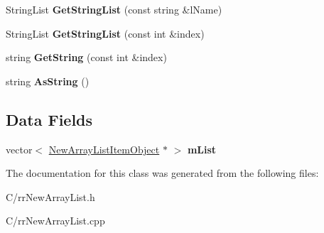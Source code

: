 \begin{DoxyCompactItemize}
\item 
\hypertarget{classrrc_1_1_new_array_list_a88f413f85d878aa501cfa0d9393af83d}{String\-List {\bfseries Get\-String\-List} (const string \&l\-Name)}\label{classrrc_1_1_new_array_list_a88f413f85d878aa501cfa0d9393af83d}

\item 
\hypertarget{classrrc_1_1_new_array_list_a0d713d8ec0ca7a64280381f7cf4f5519}{String\-List {\bfseries Get\-String\-List} (const int \&index)}\label{classrrc_1_1_new_array_list_a0d713d8ec0ca7a64280381f7cf4f5519}

\item 
\hypertarget{classrrc_1_1_new_array_list_a5d5c7bbe7e47d8a8f91911a7bcd4636d}{string {\bfseries Get\-String} (const int \&index)}\label{classrrc_1_1_new_array_list_a5d5c7bbe7e47d8a8f91911a7bcd4636d}

\item 
\hypertarget{classrrc_1_1_new_array_list_afb0cb51aaa92f311621daed306530e97}{string {\bfseries As\-String} ()}\label{classrrc_1_1_new_array_list_afb0cb51aaa92f311621daed306530e97}

\end{DoxyCompactItemize}
\subsection*{Data Fields}
\begin{DoxyCompactItemize}
\item 
\hypertarget{classrrc_1_1_new_array_list_ad51e52c728527c29a25f3b67b4043619}{vector$<$ \hyperlink{classrrc_1_1_new_array_list_item_object}{New\-Array\-List\-Item\-Object} $\ast$ $>$ {\bfseries m\-List}}\label{classrrc_1_1_new_array_list_ad51e52c728527c29a25f3b67b4043619}

\end{DoxyCompactItemize}


The documentation for this class was generated from the following files\-:\begin{DoxyCompactItemize}
\item 
C/rr\-New\-Array\-List.\-h\item 
C/rr\-New\-Array\-List.\-cpp\end{DoxyCompactItemize}
